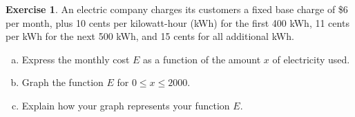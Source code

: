 \documentclass[11pt,reqno,final]{amsart}
\numberwithin{equation}{section}
\numberwithin{figure}{section}
\theoremstyle{definition} %
\newtheorem{exercise}[question]{Exercise}
\begin{document}
$ $

\begin{exercise}
        An electric company charges its customers a fixed base charge of \$6 per month, plus 10 cents per kilowatt-hour (kWh) for the first 400 kWh, 11 cents per kWh for the next 500 kWh, and 15 cents for all additional kWh.
        \begin{enumerate}[(a)]
        \item Express the monthly cost $E$ as a function of the amount $x$ of electricity used.
        \item Graph the function $E$ for $0 \leq x \leq 2000$.
        \item Explain how your graph represents your function $E$.
        \end{enumerate}
\end{exercise}
\end{document}
